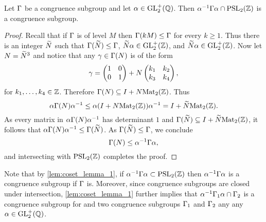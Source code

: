     \begin{lemma}\label{lem:coset_lemma_1}
      Let $\Gamma$ be a congruence subgroup and let $\alpha \in \mathrm{GL}_{2}^{+}(\mathbb{Q})$. Then $\alpha^{-1}\Gamma\alpha \cap \mathrm{PSL}_{2}(\mathbb{Z})$ is a congruence subgroup.
    \end{lemma}
    \begin{proof}
      Recall that if $\Gamma$ is of level $M$ then $\Gamma(kM) \le \Gamma$ for every $k \ge 1$. Thus there is an integer $\widetilde{N}$ such that $\Gamma(\widetilde{N}) \le \Gamma$, $\widetilde{N}\alpha \in \mathrm{GL}_{2}^{+}(\mathbb{Z})$, and $\widetilde{N}\alpha \in \mathrm{GL}_{2}^{+}(\mathbb{Z})$. Now let $N = \widetilde{N}^{3}$ and notice that any $\gamma \in \Gamma(N)$ is of the form
      \[
        \gamma = \begin{pmatrix} 1 & 0 \\ 0 & 1 \end{pmatrix}+N\begin{pmatrix} k_{1} & k_{2} \\ k_{3} & k_{4} \end{pmatrix},
      \]
      for $k_{1},\ldots,k_{4} \in \mathbb{Z}$. Therefore $\Gamma(N) \subseteq I+N\mathrm{Mat}_{2}(\mathbb{Z})$. Thus
      \[
        \alpha\Gamma(N)\alpha^{-1} \le \alpha(I+N\mathrm{Mat}_{2}(\mathbb{Z}))\alpha^{-1} = I+\widetilde{N}\mathrm{Mat}_{2}(\mathbb{Z}).
      \]
      As every matrix in $\alpha\Gamma(N)\alpha^{-1}$ has determinant $1$ and $\Gamma(\widetilde{N}) \subseteq I+\widetilde{N}\mathrm{Mat}_{2}(\mathbb{Z})$, it follows that $\alpha\Gamma(N)\alpha^{-1} \le \Gamma(\widetilde{N})$. As $\Gamma(\widetilde{N}) \le \Gamma$, we conclude
      \[
        \Gamma(N) \le \alpha^{-1}\Gamma\alpha,
      \]
      and intersecting with $\mathrm{PSL}_{2}(\mathbb{Z})$ completes the proof.
    \end{proof}

    Note that by \cref{lem:coset_lemma_1}, if $\alpha^{-1}\Gamma\alpha \subset \mathrm{PSL}_{2}(\mathbb{Z})$ then $\alpha^{-1}\Gamma\alpha$ is a congruence subgroup if $\Gamma$ is. Moreover, since congruence subgroups are closed under intersection, \cref{lem:coset_lemma_1} further implies that $\alpha^{-1}\Gamma_{1}\alpha \cap \Gamma_{2}$ is a congruence subgroup for and two congruence subgroups $\Gamma_{1}$ and $\Gamma_{2}$ any any $\alpha \in \mathrm{GL}_{2}^{+}(\mathbb{Q})$.
